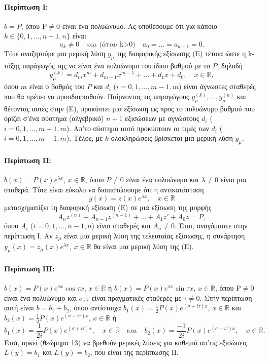 \documentclass[11pt,a4paper,twoside]{book}
\begin{document}
\paragraph{Περίπτωση I:} $b=P$, όπου P$\neq 0$ είναι ένα πολυώνυμο. Ας υποθέσουμε ότι για κάποιο $k\in\{0,1,\dots,n-1,n\}$ είναι
\[
    a_k\neq 0 \quad \text{και (όταν k>0)} \quad a_0=\dots=a_{k-1}=0.
\]
Τότε αναζητούμε μια μερική λύση $y_\mu$ της διαφορικής εξίσωσης (Ε) τέτοια ώστε η k-τάξης παράγωγός της να είναι ένα πολυώνυμο του ίδιου βαθμού με το $P$, δηλαδή
\[
    y_\mu^{(k)} = d_m x^m+d_{m-1}x^{m-1}+\dots+d_1 x+d_0, \quad x\in\mathbb{R},
\]
όπου $m$ είναι ο βαθμός του $P$ και $d_i$ ($i=0,1,\dots,m-1,m$) είναι άγνωστες σταθερές που θα πρέπει να προσδιορισθούν. Παίρνοντας τις παραγώγους $y_\mu^{(k)}, \dots, y_\mu^{(n)}$ και θέτοντας αυτές στην (Ε), προκύπτει μια εξίσωση ως προς το πολυώνυμο βαθμού που ορίζει σ'ένα σύστημα (αλγεβρικό) $n+1$ εξισώσεων με αγνώστους $d_i$ ($i=0,1,\dots,m-1,m$). Απ'το σύστημα αυτό προκύπτουν οι τιμές των $d_i$ ($i=0,1,\dots,m-1,m$). Τέλος, με $k$ ολοκληρώσεις βρίσκεται μια μερική λύση $y_\mu$.

\paragraph{Περίπτωση II:} $b(x)=P(x)e^{\lambda x}$, $x\in\mathbb{R}$, όπου $P\neq 0$ είναι ένα πολυώνυμο και $\lambda\neq 0$ είναι μια σταθερά. Τότε είναι εύκολο να διαπιστώσουμε ότι η αντικατάσταση
\[
    y(x)=z(x)e^{\lambda x}, \quad x\in\mathbb{R}
\]
μετασχηματίζει τη διαφορική εξίσωση (Ε) σε μια εξίσωση της μορφής
\[
    A_n z^{(n)} + A_{n-1} z^{(n-1)} + \dots + A_1 z' + A_0 z = P,
\]
όπου $A_i$ ($i=0,1,\dots,n-1,n$) είναι σταθερές και $A_n\neq 0$. Έτσι, αναγόμαστε στην περίπτωση Ι. Αν $z_\mu$ είναι μια μερική λύση της τελευταίας εξίσωσης, η συνάρτηση $y_\mu(x)=z_\mu(x)e^{\lambda x}$, $x\in\mathbb{R}$ θα είναι μια μερική λύση της (Ε).

\paragraph{Περίπτωση III:} $b(x)=P(x)e^{\sigma x}\cos\tau x$, $x\in\mathbb{R}$ ή $b(x)=P(x)e^{\sigma x}\sin\tau x$, $x\in\mathbb{R}$, όπου P$\neq 0$ είναι ένα πολυώνυμο και $\sigma,\tau$ είναι πραγματικές σταθερές με $\tau\neq 0$. Στην περίπτωση αυτή είναι $b=b_1+b_2$, όπου αντίστοιχα $b_1(x)=\frac{1}{2}P(x)e^{(\sigma+i\tau)x}$, $x\in\mathbb{R}$ και $b_2(x)=\frac{1}{2}P(x)e^{(\sigma-i\tau)x}$, $x\in\mathbb{R}$ ή
\[
    b_1(x)=\frac{1}{2i}P(x)e^{(\sigma+i\tau)x}, \quad x\in\mathbb{R} \quad \text{και} \quad b_2(x)=\frac{-1}{2i}P(x)e^{(\sigma-i\tau)x}, \quad x\in\mathbb{R}.
\]
Έτσι, αρκεί (θεώρημα 13) να βρεθούν μερικές λύσεις για καθεμιά απ'τις εξισώσεις $L(y)=b_1$ και $L(y)=b_2$, που είναι της περίπτωσης ΙΙ.
\end{document}
